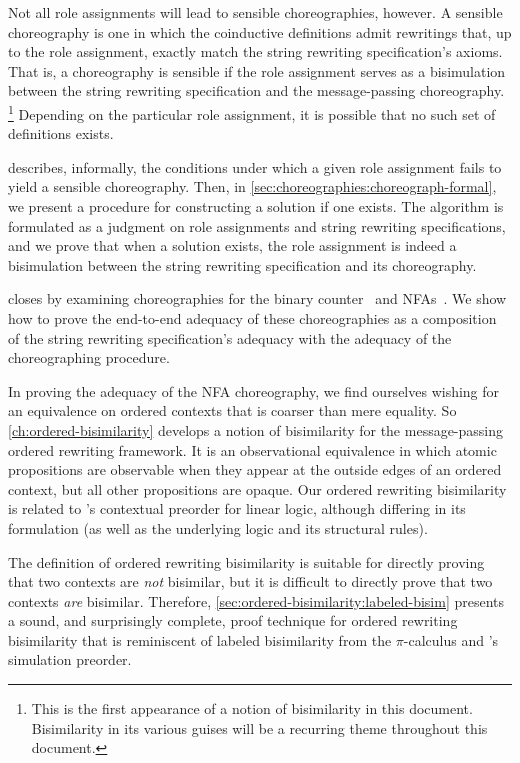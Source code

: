 Not all role assignments will lead to sensible choreographies, however.
A sensible choreography is one in which the coinductive definitions admit rewritings that, up to the role assignment, exactly match the string rewriting specification's axioms.
That is, a choreography is sensible if the role assignment serves as a bisimulation between the string rewriting specification and the message-passing choreography.%
\footnote[][-1.2\baselineskip]{This is the first appearance of a notion of bisimilarity in this document.
Bisimilarity in its various guises will be a recurring theme throughout this document.}
Depending on the particular role assignment, it is possible that no such set of definitions exists.

 describes, informally, the conditions under which a given role assignment fails to yield a sensible choreography.
Then, in \cref{sec:choreographies:choreograph-formal}, we present a procedure for constructing a solution if one exists.
The algorithm is formulated as a judgment on role assignments and string rewriting specifications, and we prove that when a solution exists, the role assignment is indeed a bisimulation between the string rewriting specification and its choreography.

 closes by examining choreographies for the binary counter~ and \acsp*{NFA}~.
We show how to prove the end-to-end adequacy of these choreographies as a composition of the string rewriting specification's adequacy with the adequacy of the choreographing procedure.

In proving the adequacy of the \acs*{NFA} choreography, we find ourselves wishing for an equivalence on ordered contexts that is coarser than mere equality.
So \cref{ch:ordered-bisimilarity} develops a notion of bisimilarity for the message-passing ordered rewriting framework.
It is an observational equivalence in which atomic propositions are observable when they appear at the outside edges of an ordered context, but all other propositions are opaque.
Our ordered rewriting bisimilarity is related to \citeauthor{Deng+:MSCS16}'s contextual preorder for linear logic\autocite{Deng+:MSCS16}, although differing in its formulation (as well as the underlying logic and its structural rules).

The definition of ordered rewriting bisimilarity is suitable for directly proving that two contexts are \emph{not} bisimilar, but it is difficult to directly prove that two contexts \emph{are} bisimilar.
Therefore, \cref{sec:ordered-bisimilarity:labeled-bisim} presents a sound, and surprisingly complete, proof technique for ordered rewriting bisimilarity that is reminiscent of labeled bisimilarity from the $\pi$-calculus\autocite{Sangiorgi+Walker:CUP03} and \citeauthor{Deng+:MSCS16}'s simulation preorder\autocite{Deng+:MSCS16}.

